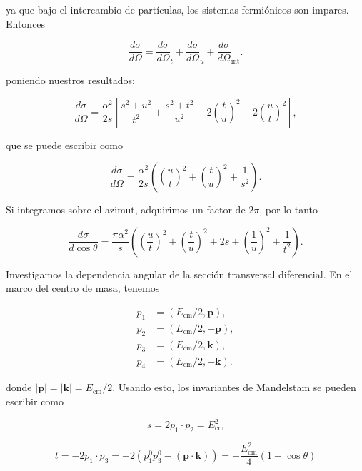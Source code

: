ya que bajo el intercambio de partículas, los sistemas fermiónicos son impares. Entonces

\begin{equation}
\frac{d\sigma}{d\Omega} = \frac{d\sigma}{d\Omega}_t + \frac{d\sigma}{d\Omega}_u + \frac{d\sigma}{d\Omega}_{\text{int}}.
\end{equation}

poniendo nuestros resultados:

\begin{equation}
\frac{d\sigma}{d\Omega} = \frac{\alpha^2}{2s} \left[ \frac{s^2 + u^2}{t^2} + \frac{s^2 + t^2}{u^2} - 2 \left( \frac{t}{u} \right)^2 - 2 \left( \frac{u}{t} \right)^2 \right],
\end{equation}

que se puede escribir como

\begin{equation}
\frac{d\sigma}{d\Omega} = \frac{\alpha^2}{2s} \left( \left( \frac{u}{t} \right)^2 + \left( \frac{t}{u} \right)^2 + \frac{1}{s^2} \right) .
\end{equation}

Si integramos sobre el azimut, adquirimos un factor de $2\pi$, por lo tanto

\begin{equation}
\frac{d\sigma}{d\cos\theta} = \frac{\pi \alpha^2}{s} \left( \left( \frac{u}{t} \right)^2 + \left( \frac{t}{u} \right)^2 + 2 s + \left( \frac{1}{u} \right)^2 + \frac{1}{t^2} \right).
\end{equation}

Investigamos la dependencia angular de la sección transversal diferencial. En el marco del centro de masa, tenemos

$$\begin{aligned}
  p_1 &= (E_{\text{cm}}/2, \mathbf{p}), \\
  p_2 &= (E_{\text{cm}}/2, -\mathbf{p}), \\
  p_3 &= (E_{\text{cm}}/2, \mathbf{k}), \\
  p_4 &= (E_{\text{cm}}/2, -\mathbf{k}).
  \end{aligned}$$

  donde $|\mathbf{p}| = |\mathbf{k}| = E_{\text{cm}}/2$. Usando esto, los invariantes de Mandelstam se pueden escribir como

\begin{equation}
s = 2p_1 \cdot p_2 = E_{\text{cm}}^2
\end{equation}

\begin{equation}
t = -2p_1 \cdot p_3 = -2(p_1^0 p_3^0 - (\mathbf{p} \cdot \mathbf{k}))
= -\frac{E_{\text{cm}}^2}{4} (1 - \cos \theta)
\end{equation}

